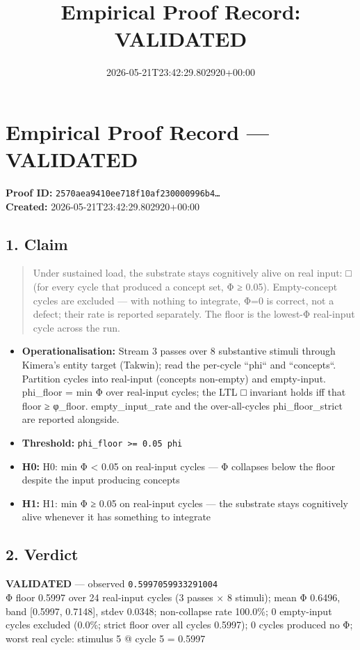 \documentclass{article}
\title{Empirical Proof Record: VALIDATED}
\date{2026-05-21T23:42:29.802920+00:00}
\begin{document}
\maketitle
\section*{Empirical Proof Record --- \textcolor{validated}{\textbf{VALIDATED}}}
\textbf{Proof ID:} \texttt{2570aea9410ee718f10af230000996b4\dots}\\
\textbf{Created:} 2026-05-21T23:42:29.802920+00:00
\subsection*{1. Claim}
\begin{quote}Under sustained load, the substrate stays cognitively alive on real input: □ (for every cycle that produced a concept set, Φ ≥ 0.05). Empty-concept cycles are excluded — with nothing to integrate, Φ=0 is correct, not a defect; their rate is reported separately. The floor is the lowest-Φ real-input cycle across the run.\end{quote}
\begin{itemize}
\item \textbf{Operationalisation:} Stream 3 passes over 8 substantive stimuli through Kimera's entity target (Takwin); read the per-cycle ``phi`` and ``concepts``. Partition cycles into real-input (concepts non-empty) and empty-input. phi\_floor = min Φ over real-input cycles; the LTL □ invariant holds iff that floor ≥ φ\_floor. empty\_input\_rate and the over-all-cycles phi\_floor\_strict are reported alongside.
\item \textbf{Threshold:} \texttt{phi\_floor >= 0.05 phi}
\item \textbf{H0:} H0: min Φ < 0.05 on real-input cycles — Φ collapses below the floor despite the input producing concepts
\item \textbf{H1:} H1: min Φ ≥ 0.05 on real-input cycles — the substrate stays cognitively alive whenever it has something to integrate
\end{itemize}
\subsection*{2. Verdict}
\textcolor{validated}{\textbf{VALIDATED}} --- observed \texttt{0.5997059933291004}\\
Φ floor 0.5997 over 24 real-input cycles (3 passes × 8 stimuli); mean Φ 0.6496, band [0.5997, 0.7148], stdev 0.0348; non-collapse rate 100.0\%; 0 empty-input cycles excluded (0.0\%; strict floor over all cycles 0.5997); 0 cycles produced no Φ; worst real cycle: stimulus 5 @ cycle 5 = 0.5997
\end{document}
